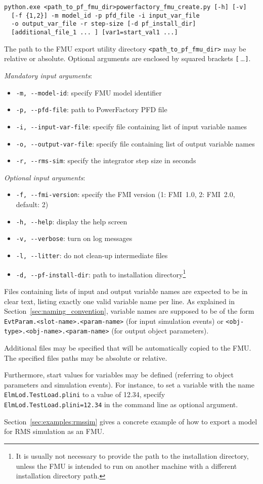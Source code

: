 \begin{verbatim}
python.exe <path_to_pf_fmu_dir>powerfactory_fmu_create.py [-h] [-v] 
  [-f {1,2}] -m model_id -p pfd_file -i input_var_file 
  -o output_var_file -r step-size [-d pf_install_dir] 
  [additional_file_1 ... ] [var1=start_val1 ...]
\end{verbatim}

The path to the \fmipp \pf FMU export utility directory \verb!<path_to_pf_fmu_dir>! may be relative or absolute.
Optional arguments are enclosed by squared brackets \verb![!$\,$\ldots\verb!]!.
  
\textit{Mandatory input arguments}:
\begin{itemize}
  \item \verb!-m, --model-id!: specify FMU model identifier
  \item \verb!-p, --pfd-file!: path to PowerFactory PFD file
  \item \verb!-i, --input-var-file!: specify file containing list of input variable names
  \item \verb!-o, --output-var-file!: specify file containing list of output variable names
  \item \verb!-r, --rms-sim!: specify the integrator step size in seconds
\end{itemize}
\textit{Optional input arguments}:
\begin{itemize}
  \item \verb!-f, --fmi-version!: specify the FMI version (1: FMI~1.0, 2: FMI~2.0, default: 2)
  \item \verb!-h, --help!: display the help screen
  \item \verb!-v, --verbose!: turn on log messages
  \item \verb!-l, --litter!: do not clean-up intermediate files
  \item \verb!-d, --pf-install-dir!: path to \pf installation directory\footnote{It is usually not necessary to provide the path to the \pf installation directory, unless the FMU is intended to run on another machine with a different installation directory path.}
\end{itemize}
Files containing lists of input and output variable names are expected to be in clear text, listing exactly one valid variable name per line.
As explained in Section~\ref{sec:naming_convention}, variable names are supposed to be of the form \texttt{EvtParam.<slot-name>.<param-name>} (for input simulation events) or \texttt{<obj-type>.<obj-name>.<param-name>} (for output object parameters).

Additional files may be specified that will be automatically copied to the FMU. The specified files paths may be absolute or relative.

Furthermore, start values for variables may be defined (referring to object parameters and simulation events). For instance, to set a variable with the name \texttt{ElmLod.TestLoad.plini} to a value of 12.34, specify \texttt{ElmLod.TestLoad.plini=12.34} in the command line as optional argument.

Section~\ref{sec:examples:rmssim} gives a concrete example of how to export a model for RMS simulation as an FMU.

